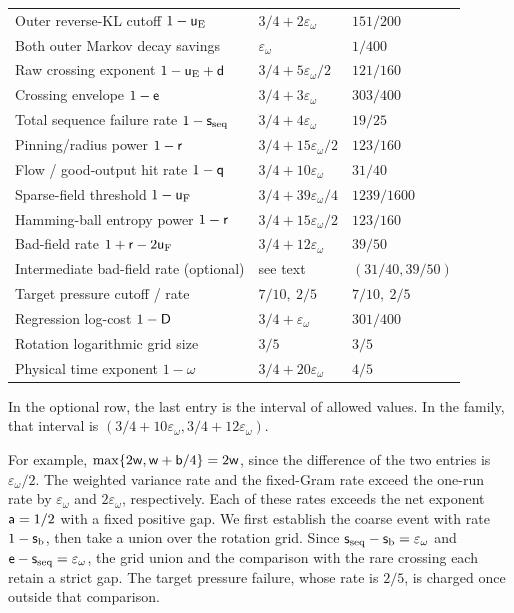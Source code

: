 \begin{longtable}{@{}>{\raggedright\arraybackslash}p{}ll@{}}
Outer reverse-KL cutoff $1-\mathsf{u}_{\rm E}$ & $3/4+2\varepsilon_\omega$ & $151/200$\\
Both outer Markov decay savings & $\varepsilon_\omega$ & $1/400$\\
Raw crossing exponent $1-\mathsf{u}_{\rm E}+\mathsf{d}$ & $3/4+5\varepsilon_\omega/2$ & $121/160$\\
Crossing envelope $1-\mathsf{e}$ & $3/4+3\varepsilon_\omega$ & $303/400$\\
Total sequence failure rate $1-\mathsf{s}_{\rm seq}$ & $3/4+4\varepsilon_\omega$ & $19/25$\\
Pinning/radius power $1-\mathsf{r}$ & $3/4+15\varepsilon_\omega/2$ & $123/160$\\
Flow / good-output hit rate $1-\mathsf{q}$ & $3/4+10\varepsilon_\omega$ & $31/40$\\
Sparse-field threshold $1-\mathsf{u}_{\rm F}$ & $3/4+39\varepsilon_\omega/4$ & $1239/1600$\\
Hamming-ball entropy power $1-\mathsf{r}$ & $3/4+15\varepsilon_\omega/2$ & $123/160$\\
Bad-field rate $1+\mathsf{r}-2\mathsf{u}_{\rm F}$ & $3/4+12\varepsilon_\omega$ & $39/50$\\
Intermediate bad-field rate (optional) & see text & $(31/40,39/50)$\\
Target pressure cutoff / rate & $7/10,\ 2/5$ & $7/10,\ 2/5$\\
Regression log-cost $1-\mathsf{D}$ & $3/4+\varepsilon_\omega$ & $301/400$\\
Rotation logarithmic grid size & $3/5$ & $3/5$\\
Physical time exponent $1-\omega$ & $3/4+20\varepsilon_\omega$ & $4/5$\\
\end{longtable}
\endgroup
In the optional row, the last entry is the interval of allowed values.
In the family, that interval is
$(3/4+10\varepsilon_\omega,3/4+12\varepsilon_\omega)$.

For example, $\max\{2\mathsf{w},\mathsf{w}+\mathsf{b}/4\}=2\mathsf{w}$, since the
difference of the two entries is $\varepsilon_\omega/2$. The weighted
variance rate and the fixed-Gram rate exceed the one-run rate by
$\varepsilon_\omega$ and $2\varepsilon_\omega$, respectively. Each of
these rates exceeds the net exponent $\mathsf{a}=1/2$ with a fixed positive
gap. We first establish the coarse event with rate $1-\mathsf{s}_{\rm b}$,
then take a union over the rotation grid. Since
$\mathsf{s}_{\rm seq}-\mathsf{s}_{\rm b}=\varepsilon_\omega$ and
$\mathsf{e}-\mathsf{s}_{\rm seq}=\varepsilon_\omega$, the grid union and the
comparison with the rare crossing each retain a strict gap. The
target pressure failure, whose rate is $2/5$, is charged once outside
that comparison.

